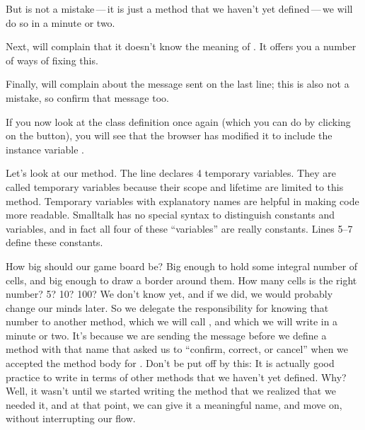 \documentclass[a4paper,10pt,twoside]{book}
\begin{document}
But  is not a mistake\,---\,it is just a method that we haven't yet defined\,---\,we will do so in a minute or two.


Next, \squeak will complain that it doesn't know the meaning of .
It offers you a number of ways of fixing this.

Finally, \squeak will complain about the message  sent on the last line; this is also not a mistake, so confirm that message too.

If you now look at the class definition once again (which you can do by clicking on the  button), you will see that the browser has modified it to include the instance variable .

Let's look at our  method.
The line   declares 4 temporary variables.
They are called temporary variables because their scope and lifetime are limited to this method.
Temporary variables with explanatory names are helpful in making code more readable.
Smalltalk has no special syntax to distinguish constants and variables, and in fact all four of these ``variables'' are really constants.
Lines 5--7 define these constants.

How big should our game board be?
Big enough to hold some integral number of cells, and big enough to draw a border around them.
How many cells is the right number?
5? 10? 100?
We don't know yet, and if we did, we would probably change our minds later.
So we delegate the responsibility for knowing that number to another method, which we will call , and which we will write in a minute or two.
It's because we are sending the  message before we define a method with that name that \squeak asked us to ``confirm, correct, or cancel'' when we accepted the method body for .
Don't be put off by this:
It is actually good practice to write in terms of other methods that we haven't yet defined.
Why?
Well, it wasn't until we started writing the  method that we realized that we needed it, and at that point, we can give it a meaningful name, and move on, without interrupting our flow.
\end{document}
